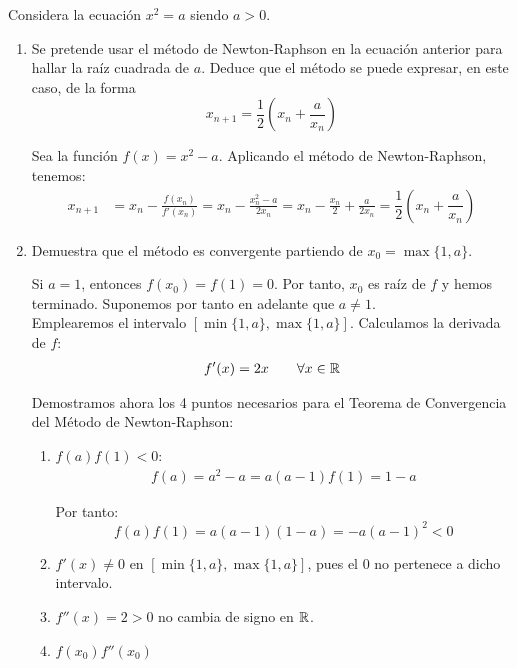 \begin{ejercicio}
    Considera la ecuación $x^2 = a$ siendo $a > 0$.
    \begin{enumerate}
        \item Se pretende usar el método de Newton-Raphson en la ecuación anterior para hallar la raíz cuadrada de $a$. Deduce que el método se puede expresar, en este caso, de la forma
        \[
            x_{n+1} = \frac{1}{2}\left(x_n + \frac{a}{x_n}\right)
        \]

        Sea la función $f(x) = x^2 - a$. Aplicando el método de Newton-Raphson, tenemos:
        \begin{align*}
            x_{n+1} &= x_n - \frac{f(x_n)}{f'(x_n)} = x_n - \frac{x_n^2 - a}{2x_n} = x_n - \frac{x_n}{2} + \frac{a}{2x_n} = \dfrac{1}{2}\left(x_n + \dfrac{a}{x_n}\right)
        \end{align*}
        \item Demuestra que el método es convergente partiendo de $x_0 = \max\{1, a\}$.
        
        Si $a=1$, entonces $f(x_0)=f(1)=0$. Por tanto, $x_0$ es raíz de $f$ y hemos terminado. Suponemos por tanto en adelante que $a\neq 1$.\\
        
        Emplearemos el intervalo $\left[\min\{1,a\},\max\{1,a\}\right]$. Calculamos la derivada de $f$:
        \begin{align*}
            f'(x) = 2x\qquad \forall x\in \mathbb{R}
        \end{align*}
        
        Demostramos ahora los 4 puntos necesarios para el Teorema de Convergencia del Método de Newton-Raphson:
        \begin{enumerate}
            \item $f(a)f(1) < 0$:
            \begin{align*}
                f(a)=a^2 - a = a(a-1)
                f(1) = 1 - a
            \end{align*}

            Por tanto:
            \begin{equation*}
                f(a)f(1) = a(a-1)(1-a) = -a(a-1)^2<0
            \end{equation*}

            \item $f'(x) \neq 0$ en $\left[\min\{1,a\},\max\{1,a\}\right]$, pues el $0$ no pertenece a dicho intervalo.
            \item $f''(x)=2 > 0$ no cambia de signo en $\mathbb{R}$.
            \item $f(x_0)f''(x_0)$
            

\end{enumerate}
\end{enumerate}
\end{ejercicio}
